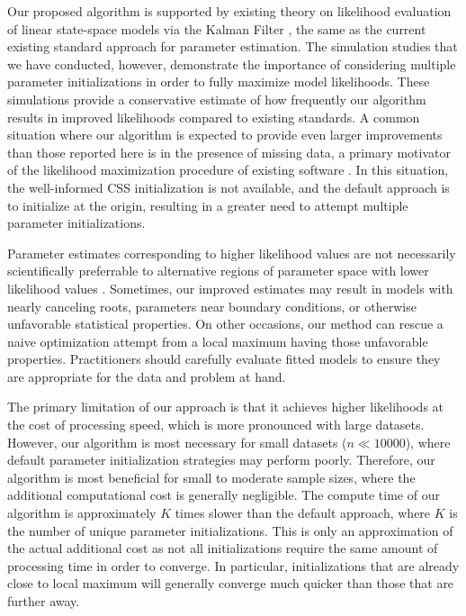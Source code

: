 Our proposed algorithm is supported by existing theory on likelihood evaluation of linear state-space models via the Kalman Filter \cite{kalman60}, the same as the current existing standard approach for parameter estimation.
The simulation studies that we have conducted, however, demonstrate the importance of considering multiple parameter initializations in order to fully maximize model likelihoods. 
These simulations provide a conservative estimate of how frequently our algorithm results in improved likelihoods compared to existing standards.
A common situation where our algorithm is expected to provide even larger improvements than those reported here is in the presence of missing data, a primary motivator of the likelihood maximization procedure of existing software \cite{ripley2002}.
In this situation, the well-informed CSS initialization is not available, and the default approach is to initialize at the origin, resulting in a greater need to attempt multiple parameter initializations.  

Parameter estimates corresponding to higher likelihood values are not necessarily scientifically preferrable to alternative regions of parameter space with lower likelihood values \cite{lecam1990}.
Sometimes, our improved estimates may result in models with nearly canceling roots, parameters near boundary conditions, or otherwise unfavorable statistical properties.
On other occasions, our method can rescue a naive optimization attempt from a local maximum having those unfavorable properties.
Practitioners should carefully evaluate fitted models to ensure they are appropriate for the data and problem at hand.

The primary limitation of our approach is that it achieves higher likelihoods at the cost of processing speed, which is more pronounced with large datasets.
However, our algorithm is most necessary for small datasets ($n \ll 10000$), where default parameter initialization strategies may perform poorly.
Therefore, our algorithm is most beneficial for small to moderate sample sizes, where the additional computational cost is generally negligible.
The compute time of our algorithm is approximately $K$ times slower than the default approach, where $K$ is the number of unique parameter initializations.
This is only an approximation of the actual additional cost as not all initializations require the same amount of processing time in order to converge.
In particular, initializations that are already close to local maximum will generally converge much quicker than those that are further away.

